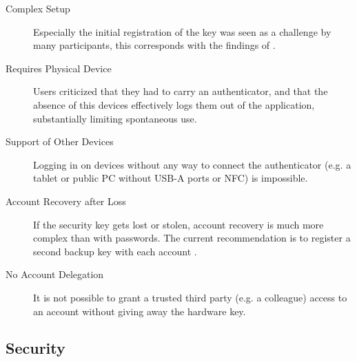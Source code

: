 \begin{description}
    \item[Complex Setup] Especially the initial registration of the key was seen as a challenge by many participants, this corresponds with the findings of \cite{das2018}.
    \item[Requires Physical Device] Users criticized that they had to carry an authenticator, and that the absence of this devices effectively logs them out of the application, substantially limiting spontaneous use.
    \item[Support of Other Devices] Logging in on devices without any way to connect the authenticator (e.g. a tablet or public PC without USB-A ports or NFC) is impossible.
    \item[Account Recovery after Loss] If the security key gets lost or stolen, account recovery is much more complex than with passwords. The current recommendation is to register a second backup key with each account \cite{gomi2019}.
    \item[No Account Delegation] It is not possible to grant a trusted third party (e.g. a colleague) access to an account without giving away the hardware key.
\end{description}


\subsection{Security}
\label{subsec:security}

